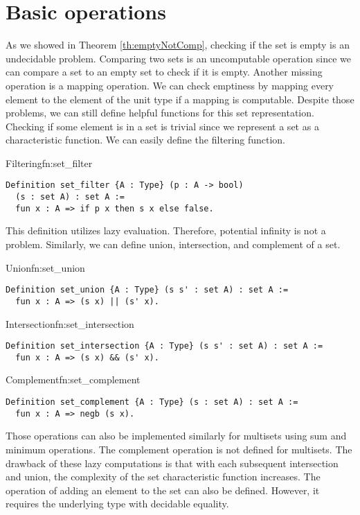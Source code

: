\section{Basic operations}
As we showed in Theorem \ref{th:emptyNotComp}, checking if the set is empty is an undecidable problem. Comparing two sets is an uncomputable operation since we can compare a set to an empty set to check if it is empty. Another missing operation is a mapping operation. We can check emptiness by mapping every element to the element of the unit type if a mapping is computable. Despite those problems, we can still define helpful functions for this set representation. Checking if some element is in a set is trivial since we represent a set as a characteristic function. We can easily define the filtering function.
\begin{func}{Filtering}{fn:set_filter}
\begin{verbatim}
Definition set_filter {A : Type} (p : A -> bool) 
  (s : set A) : set A :=
  fun x : A => if p x then s x else false.
\end{verbatim}
\end{func}
This definition utilizes lazy evaluation. Therefore, potential infinity is not a problem. Similarly, we can define union, intersection, and complement of a set.
\pagebreak
\begin{func}{Union}{fn:set_union}
\begin{verbatim}
Definition set_union {A : Type} (s s' : set A) : set A :=
  fun x : A => (s x) || (s' x).
\end{verbatim}
\end{func}
\begin{func}{Intersection}{fn:set_intersection}
\begin{verbatim}
Definition set_intersection {A : Type} (s s' : set A) : set A :=
  fun x : A => (s x) && (s' x).
\end{verbatim}
\end{func}
\begin{func}{Complement}{fn:set_complement}
\begin{verbatim}
Definition set_complement {A : Type} (s : set A) : set A :=
  fun x : A => negb (s x).
\end{verbatim}
\end{func}
Those operations can also be implemented similarly for multisets using sum and minimum operations. The complement operation is not defined for multisets. The drawback of these lazy computations is that with each subsequent intersection and union, the complexity of the set characteristic function increases. The operation of adding an element to the set can also be defined. However, it requires the underlying type with decidable equality.
